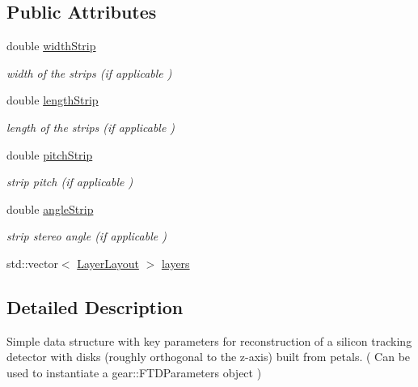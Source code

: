 \subsection*{Public Attributes}
\begin{DoxyCompactItemize}
\item 
double \hyperlink{struct_d_d4hep_1_1_d_d_rec_1_1_z_disk_petals_struct_a69d3bba6e63772378c1ceb4367a09bcd}{widthStrip}
\begin{DoxyCompactList}\small\item\em width of the strips (if applicable ) \item\end{DoxyCompactList}\item 
double \hyperlink{struct_d_d4hep_1_1_d_d_rec_1_1_z_disk_petals_struct_a8319b709fefd285ffe4b3c09461d9990}{lengthStrip}
\begin{DoxyCompactList}\small\item\em length of the strips (if applicable ) \item\end{DoxyCompactList}\item 
double \hyperlink{struct_d_d4hep_1_1_d_d_rec_1_1_z_disk_petals_struct_a73e6274d9327c8e5aa26575ee6679dee}{pitchStrip}
\begin{DoxyCompactList}\small\item\em strip pitch (if applicable ) \item\end{DoxyCompactList}\item 
double \hyperlink{struct_d_d4hep_1_1_d_d_rec_1_1_z_disk_petals_struct_a2eb7ad29999d7e75fa4f2be841aed57d}{angleStrip}
\begin{DoxyCompactList}\small\item\em strip stereo angle (if applicable ) \item\end{DoxyCompactList}\item 
std::vector$<$ \hyperlink{struct_d_d4hep_1_1_d_d_rec_1_1_z_disk_petals_struct_1_1_layer_layout}{LayerLayout} $>$ \hyperlink{struct_d_d4hep_1_1_d_d_rec_1_1_z_disk_petals_struct_a815951a6a89fafccaa6124372f43b4e2}{layers}
\end{DoxyCompactItemize}


\subsection{Detailed Description}
Simple data structure with key parameters for reconstruction of a silicon tracking detector with disks (roughly orthogonal to the z-\/axis) built from petals. ( Can be used to instantiate a gear::FTDParameters object )

